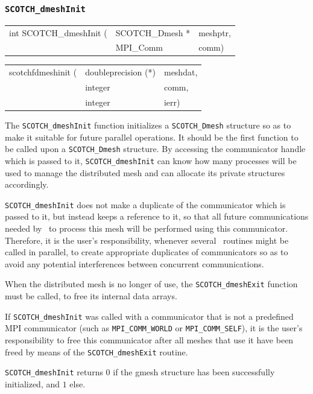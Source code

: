\subsubsection{\texttt{SCOTCH\_dmeshInit}}
\label{sec-lib-func-dmeshinit}

\begin{itemize}
\progsyn

{\tt\begin{tabular}{l@{}ll}
int SCOTCH\_dmeshInit ( & SCOTCH\_Dmesh * & meshptr, \\
                        & MPI\_Comm       & comm)
\end{tabular}}

{\tt\begin{tabular}{l@{}ll}
scotchfdmeshinit ( & doubleprecision (*) & meshdat, \\
                   & integer             & comm, \\
                   & integer             & ierr)
\end{tabular}}

\progdes

The \texttt{SCOTCH\_dmeshInit} function initializes a
\texttt{SCOTCH\_\lbt Dmesh} structure so as to make it suitable for
future parallel operations. It should be the first function to be
called upon a \texttt{SCOTCH\_\lbt Dmesh} structure. By accessing the
communicator handle which is passed to it, \texttt{SCOTCH\_dmeshInit}
can know how many processes will be used to manage the distributed
mesh and can allocate its private structures accordingly.

\texttt{SCOTCH\_dmeshInit} does not make a duplicate of the communicator
which is passed to it, but instead keeps a reference to it, so that
all future communications needed by \libscotch\ to process this mesh
will be performed using this communicator. Therefore, it is the user's
responsibility, whenever several \libscotch\ routines might be called
in parallel, to create appropriate duplicates of communicators so as
to avoid any potential interferences between concurrent
communications.

When the distributed mesh is no longer of use, the
\texttt{SCOTCH\_\lbt dmesh\lbt Exit} function must be called, to free
its internal data arrays.

If \texttt{SCOTCH\_\lbt dmesh\lbt Init} was called with a
communicator that is not a predefined MPI communicator (such as
{\tt MPI\_\tt COMM\_\lbt WORLD} or {\tt MPI\_\tt COMM\_\lbt SELF}), it
is the user's responsibility to free this communicator after
all meshes that use it have been freed by means of the
\texttt{SCOTCH\_\lbt dmesh\lbt Exit} routine.

\progret

{\tt SCOTCH\_dmeshInit} returns $0$ if the gmesh structure has been
successfully initialized, and $1$ else.
\end{itemize}

